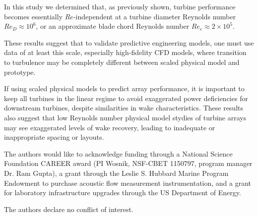 \documentclass[energies,article,accept,moreauthors,pdftex,12pt,a4paper]{mdpi}
\begin{document}
In this study we determined that, as previously shown, turbine performance
becomes essentially $Re$-independent at a turbine diameter Reynolds number $Re_D
\approx 10^6$, or an approximate blade chord Reynolds number $Re_c \approx 2
\times 10^5$.

These results suggest that to validate predictive engineering models, one must
use data of at least this scale, especially high-fidelity CFD models, where
transition to turbulence may be completely different between scaled physical
model and prototype.

If using scaled physical models to predict array performance, it is important to
keep all turbines in the linear regime to avoid exaggerated power deficiencies
for downstream turbines, despite similarities in wake characteristics. These
results also suggest that low Reynolds number physical model stydies of turbine
arrays may see exaggerated levels of wake recovery, leading to inadequate or
inappropriate spacing or layouts.


The authors would like to acknowledge funding through a National Science
Foundation CAREER award (PI Wosnik, NSF-CBET 1150797, program manager Dr. Ram
Gupta), a grant through the Leslie S. Hubbard Marine Program Endowment to
purchase acoustic flow measurement instrumentation, and a grant for laboratory
infrastructure upgrades through the US Department of Energy.


The authors declare no conflict of interest.




\end{document}
